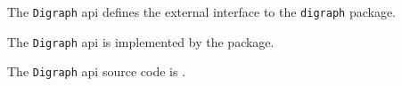 
The {\tt Digraph} api defines the external interface to the {\tt digraph} package.

The {\tt Digraph} api is implemented by the  package.

The {\tt Digraph} api source code is .
